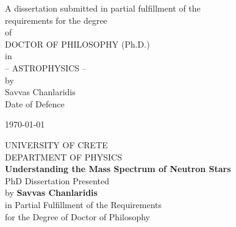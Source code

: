 \documentclass[a4paper, 10pt, twoside]{book}
\begin{document}
\begin{titlepage}
\begin{center}
            \normalsize
            A dissertation submitted in partial fulfillment of the \\
            \vspace{0.5cm} 
            requirements for the degree \\
            \vspace{0.5cm}
            of \\
            \vspace{0.5cm}
            DOCTOR OF PHILOSOPHY (Ph.D.) \\
            \vspace{0.5cm}
            in \\
            \vspace{0.5cm}
            -- ASTROPHYSICS -- \\
            \vspace{0.5cm}
            by \\
            \vspace{0.5cm}
            Savvas Chanlaridis \\
            \vspace{4cm}
            Date of Defence \\
            \vspace{0.5cm}
            \date{}{\today}
        \end{center}
    \end{titlepage}

    \newpage  %
    \mbox{}
    \thispagestyle{empty}
    
    \newpage
    \thispagestyle{empty}
    \begin{center}
        UNIVERSITY OF CRETE \\
        \vspace{0.25cm}
        DEPARTMENT OF PHYSICS \\
        \vspace{0.5cm}
        \textbf{Understanding the Mass Spectrum of Neutron Stars} \\
        \vspace{0.5cm}
        PhD Dissertation Presented \\
        \vspace{0.5cm}
        by \textbf{Savvas Chanlaridis} \\
        \vspace{0.5cm}
        in Partial Fulfillment of the Requirements \\
        \vspace{0.5cm}
        for the Degree of Doctor of Philosophy
    \end{center}
     \vspace{0.8cm}
     
\end{document}
